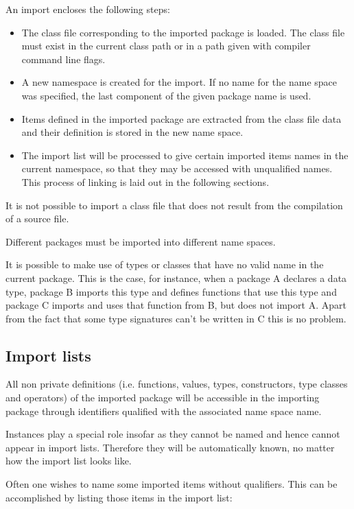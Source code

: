 An import encloses the following steps:
\begin{itemize}
\item The class file corresponding to the imported package is loaded.
The class file must exist in the current class path or in a path given
with compiler command line flags.
\item A new namespace is created for the import. If no name for the name
space was specified, the last component of the given package name is
used.
\item Items defined in the imported package are extracted from the class file
data and their definition is stored in the new name space.
\item The import list will be processed to give certain imported items names in the current namespace, so that they may be accessed with unqualified names. This process of linking is laid out in the following sections.
\end{itemize}

It is not possible to import a \java{} class file that does not result
from the compilation of a \frege{} source file.

Different packages must be imported into different name spaces.

It is possible to make use of types or classes that have no valid name in the current package. 
This is the case, for instance, when a package A declares a data type, 
package B imports this type and defines functions that use this type 
and package C imports and uses that function from B, but does not import A. 
Apart from the fact that some type signatures can't be written in C this is no problem.

\subsection{Import lists}

All non private definitions (i.e. functions, values, types, constructors,
type classes and operators) of the imported package will be accessible in
the importing package through identifiers qualified with the associated
name space name.

Instances play a special role insofar as they cannot be named and hence cannot appear in import lists. 
Therefore they will be automatically known, no matter how the import list looks like.  

Often one wishes to name some imported items without qualifiers. This
can be accomplished by listing those items in the import list:


